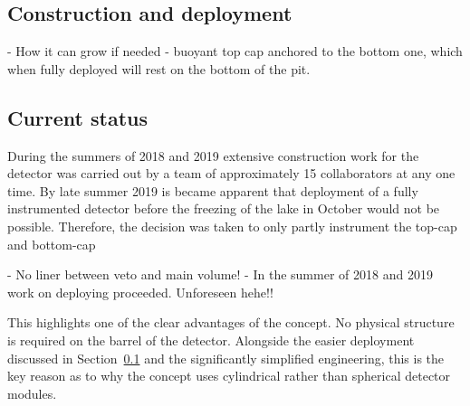 \subsection{Construction and deployment} %
\label{sec:chips_detector_deployment} %

- How it can grow if needed - buoyant top cap anchored to the bottom one, which when fully
deployed will rest on the bottom of the pit.

\subsection{Current status} %
\label{sec:chips_detector_status} %

During the summers of 2018 and 2019 extensive construction work for the \chipsfive detector was
carried out by a team of approximately 15 collaborators at any one time. By late summer 2019 is
became apparent that deployment of a fully instrumented \chipsfive detector before the freezing of
the lake in October would not be possible. Therefore, the decision was taken to only partly
instrument the top-cap and bottom-cap

- No liner between veto and main volume!
- In the summer of 2018 and 2019 work on deploying \chips proceeded. Unforeseen hehe!!

This highlights one of the clear advantages of the \chips concept. No physical structure is
required on the barrel of the detector. Alongside the easier deployment discussed in
Section~\ref{sec:chips_detector_deployment} and the significantly simplified engineering, this is
the key reason as to why the \chips concept uses cylindrical rather than spherical detector
modules.


